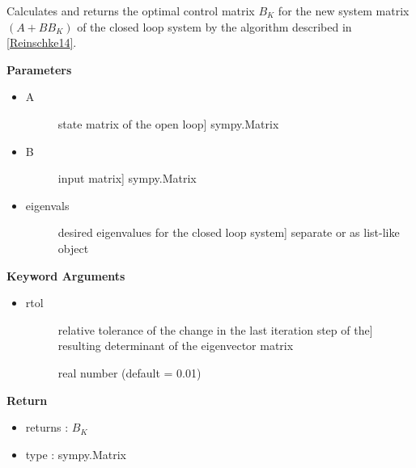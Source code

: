 \documentclass[letterpaper,10pt,english]{sphinxmanual}
\begin{document}

\begin{fulllineitems}
\label{pycontroltools:linearcontrol.robust_poleplacement.opt_place_MI}
Calculates and returns the optimal control matrix $B_K$ for the new
system matrix $(A + BB_K)$ of the closed loop system by the
algorithm described in {\hyperref[pycontroltools_sources:reinschke14]{{[}Reinschke14{]}}}.

\textbf{Parameters}
\begin{itemize}
\item {} \begin{description}
\item[{A}] \leavevmode{[}state matrix of the open loop{]}
sympy.Matrix

\end{description}

\item {} \begin{description}
\item[{B}] \leavevmode{[}input matrix{]}
sympy.Matrix

\end{description}

\item {} \begin{description}
\item[{eigenvals}] \leavevmode{[}desired eigenvalues for the closed loop system{]}
separate or as list-like object

\end{description}

\end{itemize}

\textbf{Keyword Arguments}
\begin{itemize}
\item {} \begin{description}
\item[{rtol}] \leavevmode{[}relative tolerance of the change in the last iteration step of the{]}
resulting determinant of the eigenvector matrix

real number (default = 0.01)

\end{description}

\end{itemize}

\textbf{Return}
\begin{itemize}
\item {} 
returns :  $B_K$

\item {} 
type : sympy.Matrix

\end{itemize}

\end{fulllineitems}
\end{document}
